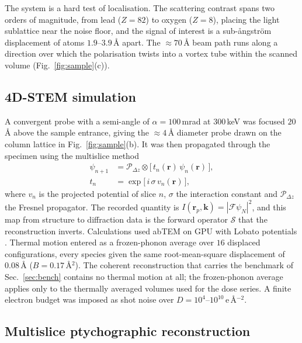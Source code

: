 \documentclass[aps,prb,twocolumn,superscriptaddress,floatfix,nofootinbib]{revtex4-2}
\begin{document}
The system is a hard test of localisation. The scattering contrast spans two orders of magnitude, from lead ($Z=82$) to oxygen ($Z=8$), placing the light sublattice near the noise floor, and the signal of interest is a sub-\aa{}ngstr\"om displacement of atoms $1.9$--$3.9$\,\AA{} apart. The $\approx70$\,\AA{} beam path runs along a direction over which the polarisation twists into a vortex tube within the scanned volume (Fig.~\ref{fig:sample}(c)).

\subsection{4D-STEM simulation}

A convergent probe with a semi-angle of $\alpha=100$\,mrad at $300$\,keV was focused $20$\,\AA{} above the sample entrance, giving the ${\approx}4$\,\AA{} diameter probe drawn on the column lattice in Fig.~\ref{fig:sample}(b). It was then propagated through the specimen using the multislice method \citep{CowleyMoodie1957}
\begin{equation}
  \begin{split} \psi_{n+1} &= \mathcal{P}_{\Delta z}\!\otimes\!\big[\,t_n(\mathbf{r})\,\psi_n(\mathbf{r})\,\big], \\[2pt] t_n &= \exp\!\big[\,i\,\sigma\, v_n(\mathbf{r})\,\big], \end{split} \label{eq:multislice}
\end{equation}
where $v_n$ is the projected potential of slice $n$, $\sigma$ the interaction constant and $\mathcal{P}_{\Delta z}$ the Fresnel propagator. The recorded quantity is $I(\mathbf{r}_p,\mathbf{k})=|\mathcal{F}\psi_N|^2$, and this map from structure to diffraction data is the forward operator $\mathcal{S}$ that the reconstruction inverts. Calculations used abTEM \citep{MadsenSusi2021} on GPU with Lobato potentials \citep{LobatoVanDyck2014}. Thermal motion entered as a frozen-phonon average \citep{LoaneXuSilcox1991} over $16$ displaced configurations, every species given the same root-mean-square displacement of $0.08$\,\AA{} ($B=0.17$\,\AA$^2$). The coherent reconstruction that carries the benchmark of Sec.~\ref{sec:bench} contains no thermal motion at all; the frozen-phonon average applies only to the thermally averaged volumes used for the dose series. A finite electron budget was imposed as shot noise over $D=10^{4}$--$10^{10}$\,e\,\AA$^{-2}$.

\subsection{Multislice ptychographic reconstruction}
\end{document}

